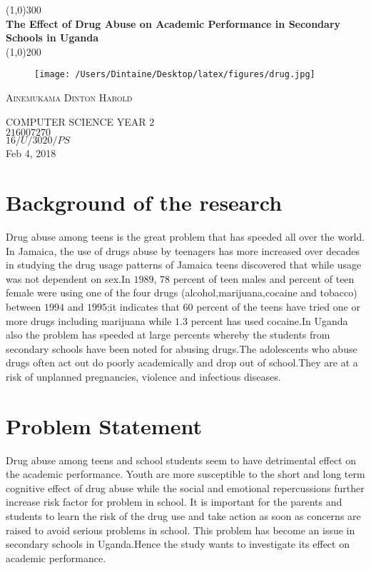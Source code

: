 \documentclass{article}
\begin{document}
\begin{titlepage}
	\begin{center}
	\line(1,0){300}\\
	[0.25in]
	\huge{\bfseries The Effect of Drug Abuse on Academic Performance in Secondary Schools in Uganda}\\
	[2mm]
	\line(1,0){200}\\
		\begin{figure}[H]
		\centering
		\texttt{[image: /Users/Dintaine/Desktop/latex/figures/drug.jpg]}
		
		\end{figure}
	\end{center}
\begin{flushright}
\textsc{\large Ainemukama Dinton Harold}
 
 COMPUTER SCIENCE YEAR $2$\\
$216007270$\\
$16/U/3020/PS$\\
Feb 4, 2018\\
\end{flushright}
	
\end{titlepage}
\tableofcontents
\thispagestyle{empty}
\cleardoublepage

\setcounter{page}{1}
\section{Background of the research}
Drug abuse among teens is the great problem that has speeded all over the world. In Jamaica, the use of drugs abuse by teenagers has more increased over decades in studying the drug usage patterns of Jamaica teens discovered that while usage was not dependent on sex.In $1989$, $78$ percent of teen males and percent of teen female were using one of the four drugs (alcohol,marijuana,cocaine and tobacco) between $1994$ and $1995$;it indicates that $60$ percent of the teens have tried one or more drugs including marijuana while $1.3$ percent has used cocaine.In Uganda also the problem has speeded at large percents whereby the students from secondary schools have been noted for abusing drugs.The adolescents who abuse drugs  often act out do poorly academically and drop out of school.They are at a risk of unplanned pregnancies, violence and infectious diseases.
\section{Problem Statement}
Drug abuse among teens and school students seem to have detrimental effect on the academic performance. Youth are more susceptible to the short and long term cognitive effect of drug abuse while the social and emotional repercussions further increase risk factor for problem in school. It is important for the parents and students to learn the risk of the drug use and take action as soon as concerns are raised to avoid serious problems in school. This problem has become an  issue in secondary schools in Uganda.Hence the study wants to investigate its effect on academic performance.
\end{document}
